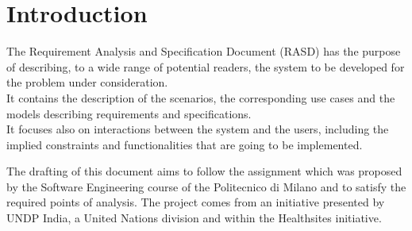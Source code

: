 \chapter{Introduction}

The Requirement Analysis and Specification Document (RASD) has the purpose of describing, to a wide range of potential readers, the system to be developed for the problem under consideration.\\ 
It contains the description of the scenarios, the corresponding use cases and the models describing requirements and specifications.\\
It focuses also on interactions between the system and the users, including the implied  constraints and functionalities that are going to be implemented.

The drafting of this document aims to follow the assignment which was proposed by the Software Engineering course of the Politecnico di Milano and to satisfy the required points of analysis. 
The project comes from an initiative presented by UNDP India, a United Nations division and within the Healthsites initiative.






